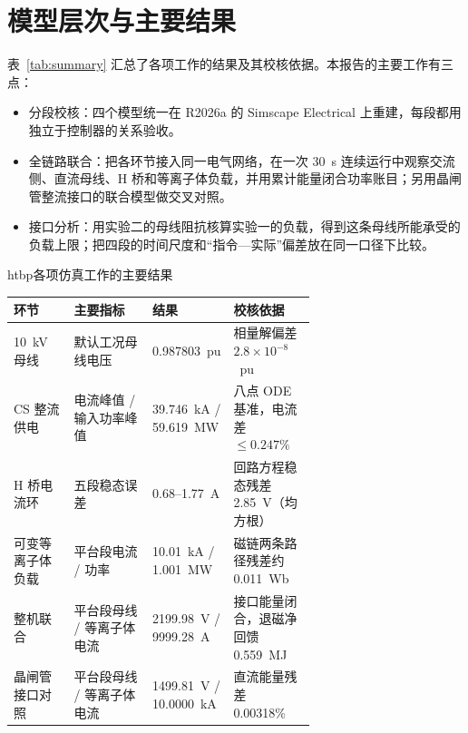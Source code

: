 \section{模型层次与主要结果}

表~\ref{tab:summary} 汇总了各项工作的结果及其校核依据。本报告的主要工作有三点：

\begin{itemize}
  \item 分段校核：四个模型统一在 R2026a 的 Simscape Electrical 上重建，每段都用独立于控制器的关系验收。
  \item 全链路联合：把各环节接入同一电气网络，在一次 30~s 连续运行中观察交流侧、直流母线、H 桥和等离子体负载，并用累计能量闭合功率账目；另用晶闸管整流接口的联合模型做交叉对照。
  \item 接口分析：用实验二的母线阻抗核算实验一的负载，得到这条母线所能承受的负载上限；把四段的时间尺度和“指令—实际”偏差放在同一口径下比较。
\end{itemize}

\begin{dtable}{htbp}{各项仿真工作的主要结果}
\label{tab:summary}
\begin{tabularx}{\linewidth}{P{0.2\linewidth}P{0.26\linewidth}P{0.2\linewidth}L}
\toprule
\headrow 环节 & 主要指标 & 结果 & 校核依据 \\
~kV 母线 & 默认工况母线电压 & 0.987803~pu & 相量解偏差 $2.8\times10^{-8}$~pu \\
CS 整流供电 & 电流峰值 / 输入功率峰值 & 39.746~kA / 59.619~MW & 八点 ODE 基准，电流差 $\le0.247\%$ \\
H 桥电流环 & 五段稳态误差 & 0.68--1.77~A & 回路方程稳态残差 2.85~V（均方根） \\
可变等离子体负载 & 平台段电流 / 功率 & 10.01~kA / 1.001~MW & 磁链两条路径残差约 0.011~Wb \\
整机联合 & 平台段母线 / 等离子体电流 & 2199.98~V / 9999.28~A & 接口能量闭合，退磁净回馈 0.559~MJ \\
晶闸管接口对照 & 平台段母线 / 等离子体电流 & 1499.81~V / 10.0000~kA & 直流能量残差 0.00318\% \\
\bottomrule
\end{tabularx}
\end{dtable}
